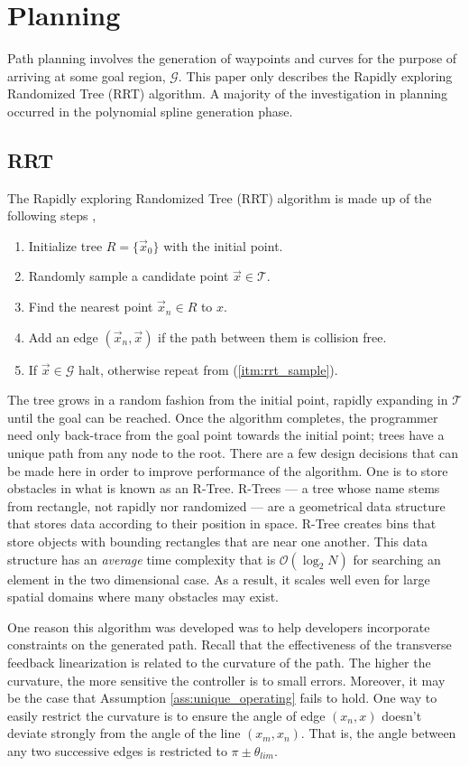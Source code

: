 \documentclass[oneside, 11pt]{book}
\begin{document}
\chapter{Planning}\label{sec:planning}
Path planning involves the generation of waypoints and curves for the purpose of arriving at some goal region, $\mathcal{G}$. This paper only describes the Rapidly exploring Randomized Tree (RRT) algorithm. A majority of the investigation in planning occurred in the polynomial spline generation phase.

\section{RRT}
The Rapidly exploring Randomized Tree (RRT) algorithm is made up of the following steps \cite{Karaman11},
\begin{enumerate}
    \item Initialize tree $R=\{ \vec{x}_0 \}$ with the initial point.
    \item Randomly sample a candidate point $\vec{x} \in \mathcal{T}$.\label{itm:rrt_sample}
    \item Find the nearest point $\vec{x}_n\in R$ to $x$.
    \item Add an edge $(\vec{x}_n, \vec{x})$ if the path between them is collision free.
    \item If $\vec{x}\in\mathcal{G}$ halt, otherwise repeat from (\ref{itm:rrt_sample}).
\end{enumerate}
The tree grows in a random fashion from the initial point, rapidly expanding in $\mathcal{T}$ until the goal can be reached. Once the algorithm completes, the programmer need only back-trace from the goal point towards the initial point; trees have a unique path from any node to the root. There are a few design decisions that can be made here in order to improve performance of the algorithm. One is to store obstacles in what is known as an R-Tree. R-Trees --- a tree whose name stems from rectangle, not rapidly nor randomized --- are a geometrical data structure that stores data according to their position in space. R-Tree creates bins that store objects with  bounding rectangles that are near one another. This data structure has an \emph{average} time complexity that is $\mathcal{O}(\log_2 N)$ for searching an element in the two dimensional case. As a result, it scales well even for large spatial domains where many obstacles may exist.

One reason this algorithm was developed was to help developers incorporate constraints on the generated path. Recall that the effectiveness of the transverse feedback linearization is related to the curvature of the path. The higher the curvature, the more sensitive the controller is to small errors. Moreover, it may be the case that Assumption \ref{ass:unique_operating} fails to hold. One way to easily restrict the curvature is to ensure the angle of edge $(x_n, x)$ doesn't deviate strongly from the angle of the line $(x_m, x_n)$. That is, the angle between any two successive edges is restricted to $\pi\pm\theta_{lim}$.
\end{document}
